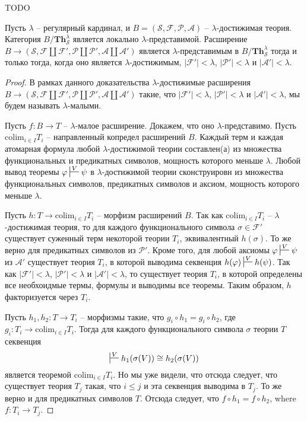 \documentclass[reqno]{amsart}
\theoremstyle{definition}
\theoremstyle{remark}
\newcommand{\bcat}[1]{\mathbf{#1}}
\newcommand{\fs}[1]{\mathrm{#1}}
\newcommand{\Th}{\bcat{Th}}
\newcommand{\colim}{\fs{colim}}
\begin{document}
\begin{prop}[th-pres]
TODO

Пусть $\lambda$ -- регулярный кардинал, и $B = (\mathcal{S},\mathcal{F},\mathcal{P},\mathcal{A})$ -- $\lambda$-достижимая теория.
Категория $B/\Th_\mathcal{S}^\lambda$ является локально $\lambda$-представимой.
Расширение $B \to (\mathcal{S}, \mathcal{F} \amalg \mathcal{F}', \mathcal{P} \amalg \mathcal{P}', \mathcal{A} \amalg \mathcal{A}')$
является $\lambda$-представимым в $B/\Th_\mathcal{S}^\lambda$ тогда и только тогда, когда оно является $\lambda$-достижимым, $|\mathcal{F}'| < \lambda$, $|\mathcal{P}'| < \lambda$ и $|\mathcal{A}'| < \lambda$.
\end{prop}
\begin{proof}
В рамках данного доказательства $\lambda$-достижимые расширения $B \to (\mathcal{S}, \mathcal{F} \amalg \mathcal{F}', \mathcal{P} \amalg \mathcal{P}', \mathcal{A} \amalg \mathcal{A}')$ такие,
что $|\mathcal{F}'| < \lambda$, $|\mathcal{P}'| < \lambda$ и $|\mathcal{A}'| < \lambda$, мы будем называть $\lambda$-малыми.

Пусть $f : B \to T$ -- $\lambda$-малое расширение.
Докажем, что оно $\lambda$-представимо.
Пусть $\colim_{i \in I} T_i$ -- направленный копредел расширений $B$.
Каждый терм и каждая атомарная формула любой $\lambda$-достижимой теории составлен(а) из множества функциональных и предикатных символов, мощность которого меньше $\lambda$.
Любой вывод теоремы $\varphi \sststile{}{V} \psi$ в $\lambda$-достижимой теории сконструировн из множества функциональных символов, предикатных символов и аксиом, мощность которого меньше $\lambda$.

Пусть $h : T \to \colim_{i \in I} T_i$ -- морфизм расширений $B$.
Так как $\colim_{i \in I} T_i$ -- $\lambda$-достижимая теория, то для каждого функционального символа $\sigma \in \mathcal{F}'$ существует суженный терм некоторой теории $T_i$, эквивалентный $h(\sigma)$.
То же верно для предикатных символов из $\mathcal{P}'$.
Кроме того, для любой аксиомы $\varphi \sststile{}{V} \psi$ из $\mathcal{A}'$ существует теория $T_i$, в которой выводима секвенция $h(\varphi) \sststile{}{V} h(\psi)$.
Так как $|\mathcal{F}'| < \lambda$, $|\mathcal{P}'| < \lambda$ и $|\mathcal{A}'| < \lambda$, то существует теория $T_i$, в которой определены все необхоидмые термы, формулы и выводимы все теоремы.
Таким образом, $h$ факторизуется через $T_i$.

Пусть $h_1,h_2 : T \to T_i$ -- морфизмы такие, что $g_i \circ h_1 = g_i \circ h_2$, где $g_i : T_i \to \colim_{i \in I} T_i$.
Тогда для каждого функционального символа $\sigma$ теории $T$ секвенция
\[ \sststile{}{V} h_1(\sigma(V)) \cong h_2(\sigma(V)) \]
является теоремой $\colim_{i \in I} T_i$.
Но мы уже видели, что отсюда следует, что существует теория $T_j$ такая, что $i \leq j$ и эта секвенция выводима в $T_j$.
То же верно и для предикатных символов $T$.
Отсюда следует, что $f \circ h_1 = f \circ h_2$, where $f : T_i \to T_j$.


\end{proof}
\end{document}
